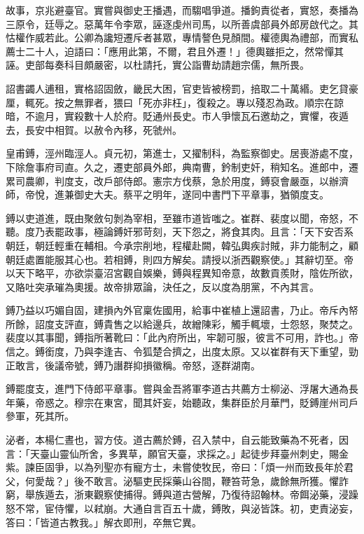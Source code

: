 \begin{pinyinscope}
 故事，京兆避臺官。實嘗與御史王播遇，而騶唱爭道。播鉤責從者，實怒，奏播為三原令，廷辱之。惡萬年令李眾，誣逐虔州司馬，以所善虞部員外郎房啟代之。其怙權作威若此。公卿為讒短遷斥者甚眾，專情謷色見顏間。權德輿為禮部，而實私薦士二十人，迫語曰：「應用此第，不爾，君且外遷！」德輿雖拒之，然常憚其誣。吏部每奏科目頗嚴密，以杜請托，實公詣曹劫請趙宗儒，無所畏。



 詔書蠲人逋租，實格詔固斂，畿民大困，官吏皆被榜罰，掊取二十萬緡。吏乞貸豪厘，輒死。按之無罪者，猥曰「死亦非枉」，復殺之。專以殘忍為政。順宗在諒暗，不逾月，實殺數十人於府。貶通州長史。市人爭懷瓦石邀劫之，實懼，夜遁去，長安中相賀。以赦令內移，死虢州。



 皇甫鎛，涇州臨涇人。貞元初，第進士，又擢制科，為監察御史。居喪游處不度，下除詹事府司直。久之，遷吏部員外郎，典南曹，鈐制吏奸，稍知名。進郎中，遷累司農卿，判度支，改戶部侍郎。憲宗方伐蔡，急於用度，鎛裒會嚴亟，以辦濟師，帝悅，進兼御史大夫。蔡平之明年，遂同中書門下平章事，猶領度支。



 鎛以吏道進，既由聚斂句剝為宰相，至雖市道皆嗤之。崔群、裴度以聞，帝怒，不聽。度乃表罷政事，極論鎛奸邪苛刻，天下怨之，將食其肉。且言：「天下安否系朝廷，朝廷輕重在輔相。今承宗削地，程權赴闕，韓弘輿疾討賊，非力能制之，顧朝廷處置能服其心也。若相鎛，則四方解矣。請授以浙西觀察使。」其辭切至。帝以天下略平，亦欲崇臺沼宮觀自娛樂，鎛與程異知帝意，故數貢羨財，陰佐所欲，又賂吐突承璀為奧援。故帝排眾論，決任之，反以度為朋黨，不內其言。



 鎛乃益以巧媚自固，建損內外官稟佐國用，給事中崔植上還詔書，乃止。帝斥內帑所餘，詔度支評直，鎛貴售之以給邊兵，故繒陳彩，觸手輒壞，士怨怒，聚焚之。裴度以其事聞，鎛指所著靴曰：「此內府所出，牢韌可服，彼言不可用，詐也。」帝信之。鎛銜度，乃與李逢吉、令狐楚合擠之，出度太原。又以崔群有天下重望，勁正敢言，後議帝號，鎛乃譖群抑損徽稱。帝怒，逐群湖南。



 鎛罷度支，進門下侍郎平章事。嘗與金吾將軍李道古共薦方士柳泌、浮屠大通為長年藥，帝惑之。穆宗在東宮，聞其奸妄，始聽政，集群臣於月華門，貶鎛崖州司戶參軍，死其所。



 泌者，本楊仁晝也，習方伎。道古薦於鎛，召入禁中，自云能致藥為不死者，因言：「天臺山靈仙所舍，多異草，願官天臺，求採之。」起徒步拜臺州刺史，賜金紫。諫臣固爭，以為列聖亦有寵方士，未嘗使牧民，帝曰：「煩一州而致長年於君父，何愛哉？」後不敢言。泌驅吏民採藥山谷間，鞭笞苛急，歲餘無所獲。懼詐窮，舉族遁去，浙東觀察使捕得。鎛與道古營解，乃復待詔翰林。帝餌泌藥，浸躁怒不常，宦侍懼，以弒崩。大通自言百五十歲，鎛敗，與泌皆誅。初，吏責泌妄，答曰：「皆道古教我。」解衣即刑，卒無它異。




\end{pinyinscope}

